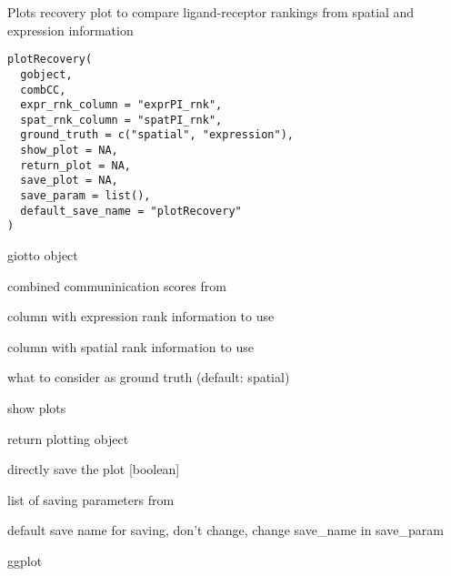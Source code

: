 \documentclass[a4paper]{book}
\begin{document}
%
\begin{Description}\relax
Plots recovery plot to compare ligand-receptor rankings from spatial and expression information
\end{Description}
%
\begin{Usage}
\begin{verbatim}
plotRecovery(
  gobject,
  combCC,
  expr_rnk_column = "exprPI_rnk",
  spat_rnk_column = "spatPI_rnk",
  ground_truth = c("spatial", "expression"),
  show_plot = NA,
  return_plot = NA,
  save_plot = NA,
  save_param = list(),
  default_save_name = "plotRecovery"
)
\end{verbatim}
\end{Usage}
%
\begin{Arguments}
\begin{ldescription}
\item[\code{gobject}] giotto object

\item[\code{combCC}] combined communinication scores from 

\item[\code{expr\_rnk\_column}] column with expression rank information to use

\item[\code{spat\_rnk\_column}] column with spatial rank information to use

\item[\code{ground\_truth}] what to consider as ground truth (default: spatial)

\item[\code{show\_plot}] show plots

\item[\code{return\_plot}] return plotting object

\item[\code{save\_plot}] directly save the plot [boolean]

\item[\code{save\_param}] list of saving parameters from 

\item[\code{default\_save\_name}] default save name for saving, don't change, change save\_name in save\_param
\end{ldescription}
\end{Arguments}
%
\begin{Value}
ggplot
\end{Value}
\end{document}
